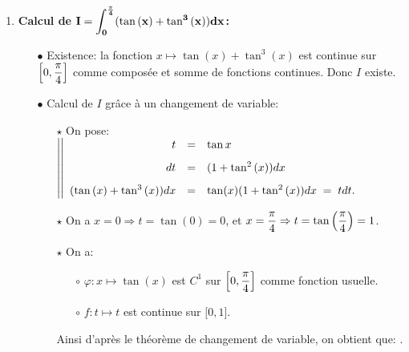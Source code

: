 \documentclass[a4paper, 11pt,reqno]{article}
\begin{document}
\begin{correction}  \;
	\begin{enumerate}
		\item \textbf{Calcul de $\mathbf{\displaystyle I=\int_{0}^{\frac{\pi}{4} } (\tan{(x)} +\tan^3{(x)}   ) dx}$:}
		      \begin{itemize}
			      \item[$\bullet$] Existence: la fonction $x\mapsto \tan{(x)} +\tan^3{(x)}$ est continue sur $\left\lbrack 0,\displaystyle\frac{\pi}{4} \right\rbrack$ comme compos\'ee et somme de fonctions continues. Donc $I$ existe.
			      \item[$\bullet$] Calcul de $I$ gr\^{a}ce \`{a} un changement de variable:
			            \begin{itemize}
				            \item[$\star$] On pose: $\left| \left|\begin{array}{rll}
						                  t                              & = & \tan{x}\vsec                            \\
						                  dt                             & = & (1+\tan^2{(x)})dx\vsec                  \\
						                  (\tan{(x)} +\tan^3{(x)}   ) dx & = & \tan (x) (1+\tan^2{(x)})dx \; = \; tdt.
					                  \end{array}\right.\right.$
				            \item[$\star$] On a $x=0 \Rightarrow t=\tan(0) = 0$, et $x=\displaystyle\frac{\pi}{4} \Rightarrow t=\tan\left(\displaystyle \frac{\pi}{4}\right) = 1$.
				            \item[$\star$] On a:
				                  \begin{itemize}
					                  \item[$\circ$] $\varphi: x\mapsto \tan{(x)}$ est $C^1$ sur $\left\lbrack 0,\displaystyle\frac{\pi}{4} \right\rbrack$ comme fonction usuelle.
					                  \item[$\circ$] $f: t\mapsto t$ est continue sur $\lbrack 0,1\rbrack$.
				                  \end{itemize}
				                  Ainsi d'apr\`{e}s le th\'eor\`{e}me de changement de variable, on obtient que:
				                  .
			            \end{itemize}
		      \end{itemize}
		     

\end{enumerate}
\end{correction}
\end{document}
